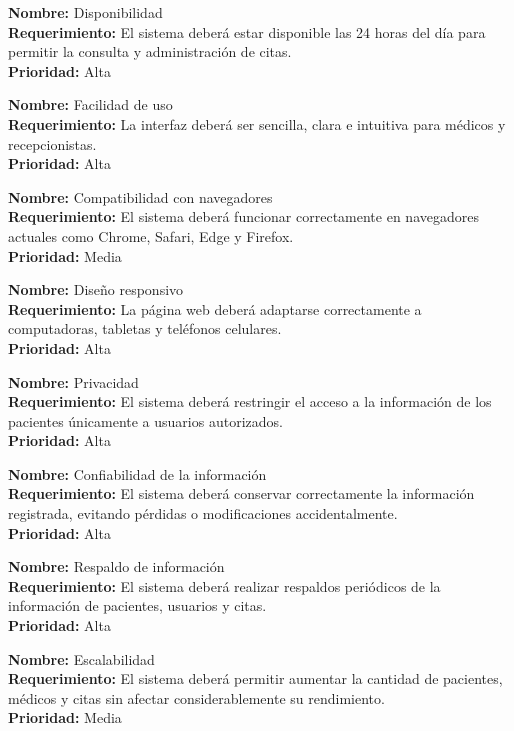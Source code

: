 \documentclass[12pt,a4paper]{article}
\begin{document}
\noindent\textbf{Nombre:} Disponibilidad \\
\textbf{Requerimiento:} El sistema deberá estar disponible las 24 horas del día para permitir la consulta y administración de citas. \\
\textbf{Prioridad:} Alta
\bigskip

\noindent\textbf{Nombre:} Facilidad de uso \\
\textbf{Requerimiento:} La interfaz deberá ser sencilla, clara e intuitiva para médicos y recepcionistas. \\
\textbf{Prioridad:} Alta
\bigskip

\noindent\textbf{Nombre:} Compatibilidad con navegadores \\
\textbf{Requerimiento:} El sistema deberá funcionar correctamente en navegadores actuales como Chrome, Safari, Edge y Firefox. \\
\textbf{Prioridad:} Media
\bigskip

\noindent\textbf{Nombre:} Diseño responsivo \\
\textbf{Requerimiento:} La página web deberá adaptarse correctamente a computadoras, tabletas y teléfonos celulares. \\
\textbf{Prioridad:} Alta
\bigskip

\noindent\textbf{Nombre:} Privacidad \\
\textbf{Requerimiento:} El sistema deberá restringir el acceso a la información de los pacientes únicamente a usuarios autorizados. \\
\textbf{Prioridad:} Alta
\bigskip

\noindent\textbf{Nombre:} Confiabilidad de la información \\
\textbf{Requerimiento:} El sistema deberá conservar correctamente la información registrada, evitando pérdidas o modificaciones accidentalmente. \\
\textbf{Prioridad:} Alta
\bigskip

\noindent\textbf{Nombre:} Respaldo de información \\
\textbf{Requerimiento:} El sistema deberá realizar respaldos periódicos de la información de pacientes, usuarios y citas. \\
\textbf{Prioridad:} Alta
\bigskip

\noindent\textbf{Nombre:} Escalabilidad \\
\textbf{Requerimiento:} El sistema deberá permitir aumentar la cantidad de pacientes, médicos y citas sin afectar considerablemente su rendimiento. \\
\textbf{Prioridad:} Media
\bigskip
\end{document}
